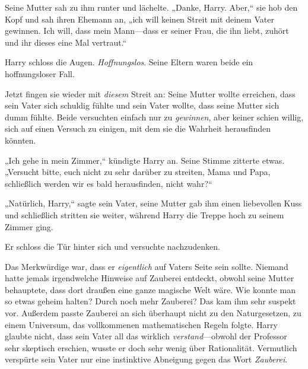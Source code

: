 Seine Mutter sah zu ihm runter und lächelte. „Danke, Harry. Aber,“ sie hob den Kopf und sah ihren Ehemann an, „ich will keinen Streit mit deinem Vater gewinnen. Ich will, dass mein Mann—dass er seiner Frau, die ihn liebt, zuhört und ihr dieses eine Mal vertraut.“

Harry schloss die Augen. \emph{Hoffnungslos}. Seine Eltern waren beide ein hoffnungsloser Fall.

Jetzt fingen sie wieder mit \emph{diesem} Streit an: Seine Mutter wollte erreichen, dass sein Vater sich schuldig fühlte und sein Vater wollte, dass seine Mutter sich dumm fühlte. Beide versuchten einfach nur zu \emph{gewinnen}, aber keiner schien willig, sich auf einen Versuch zu einigen, mit dem sie die Wahrheit herausfinden könnten.

„Ich gehe in mein Zimmer,“ kündigte Harry an. Seine Stimme zitterte etwas. „Versucht bitte, euch nicht zu sehr darüber zu streiten, Mama und Papa, schließlich werden wir es bald herausfinden, nicht wahr?“

„Natürlich, Harry,“ sagte sein Vater, seine Mutter gab ihm einen liebevollen Kuss und schließlich stritten sie weiter, während Harry die Treppe hoch zu seinem Zimmer ging.

Er schloss die Tür hinter sich und versuchte nachzudenken.

Das Merkwürdige war, dass er \emph{eigentlich} auf Vaters Seite sein sollte. Niemand hatte jemals irgendwelche Hinweise auf Zauberei entdeckt, obwohl seine Mutter behauptete, dass dort draußen eine ganze magische Welt wäre. Wie konnte man so etwas geheim halten? Durch noch mehr Zauberei? Das kam ihm sehr suspekt vor. Außerdem passte Zauberei an sich überhaupt nicht zu den Naturgesetzen, zu einem Universum, das vollkommenen mathematischen Regeln folgte. Harry glaubte nicht, dass sein Vater all das wirklich \emph{verstand}—obwohl der Professor sehr skeptisch erschien, wusste er doch sehr wenig über Rationalität. Vermutlich verspürte sein Vater nur eine instinktive Abneigung gegen das Wort \emph{Zauberei}.

